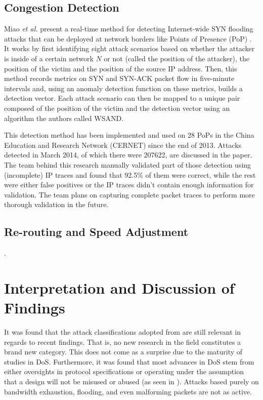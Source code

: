 \documentclass[conference]{IEEEtran}
\begin{document}
\subsection{Congestion Detection}
Miao \textit{et al.} present a real-time method for detecting Internet-wide SYN flooding attacks that can be deployed at network borders like Points of Presence (PoP) \cite{RealtimeDetection:Miao}. It works by first identifying eight attack scenarios based on whether the attacker is inside of a certain network $N$ or not (called the position of the attacker), the position of the victim and the position of the source IP address. Then, this method records metrics on SYN and SYN-ACK packet flow in five-minute intervals and, using an anomaly detection function on these metrics, builds a detection vector. Each attack scenario can then be mapped to a unique pair composed of the position of the victim and the detection vector using an algorithm the authors called WSAND.

This detection method has been implemented and used on 28 PoPs in the China Education and Research Network (CERNET) since the end of 2013. Attacks detected in March 2014, of which there were 207622, are discussed in the paper. The team behind this research manually validated part of those detection using (incomplete) IP traces and found that 92.5\% of them were correct, while the rest were either false positives or the IP traces didn't contain enough information for validation. The team plans on capturing complete packet traces to perform more thorough validation in the future.


\subsection{Re-routing and Speed Adjustment}



.



\section{Interpretation and Discussion of Findings}

It was found that the attack classifications adopted from \cite{Botnet:Hoque,Zargar:DDOSFlood} are still relevant in regards to recent findings. That is, no new research in the field constitutes a brand new category. This does not come as a surprise due to the maturity of studies in DoS. Furthermore, it was found that most advances in DoS stem from either oversights in protocol specifications or operating under the assumption that a design will not be misused or abused (as seen in \cite{DoSTCPAnalysis:Schuba,Li:LAAEM,OffPath:Cao}). Attacks based purely on bandwidth exhaustion, flooding, and even malforming packets are not as active.
\end{document}
